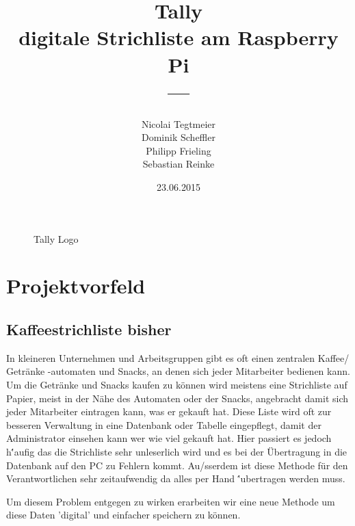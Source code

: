 \documentclass[11pt,a4paper]{article} %
\title{\normalfont\bfseries{Tally\\ digitale Strichliste am Raspberry Pi}\\---}
\author{Nicolai Tegtmeier \\ Dominik Scheffler \\ Philipp Frieling \\ Sebastian Reinke}
\date{23.06.2015}
\begin{document}



\begin{titlepage}
	\maketitle
	\begin{figure}[h]
	\caption{Tally Logo}
	\end{figure}
\end{titlepage}

\tableofcontents
\newpage

\section{Projektvorfeld}
\label{Grundlagen}


\subsection{Kaffeestrichliste bisher}

In kleineren Unternehmen und Arbeitsgruppen gibt es oft einen zentralen Kaffee/ Getr\"anke -automaten und Snacks, an denen sich jeder Mitarbeiter bedienen kann. Um die Getr\"anke und Snacks kaufen zu k\"onnen wird meistens eine Strichliste auf Papier, meist in der N\"ahe des Automaten oder der Snacks, angebracht damit sich jeder Mitarbeiter eintragen kann, was er gekauft hat. Diese Liste wird oft zur besseren Verwaltung in eine Datenbank oder Tabelle eingepflegt, damit der Administrator einsehen kann wer wie viel gekauft hat. Hier passiert es jedoch h\''aufig das die Strichliste sehr unleserlich wird und es bei der \"Ubertragung in die Datenbank auf den PC zu Fehlern kommt. Au/ss{}erdem ist diese Methode f\"ur den Verantwortlichen sehr zeitaufwendig da alles per Hand \''ubertragen werden muss.
\par
Um diesem Problem entgegen zu wirken erarbeiten wir eine neue Methode um diese Daten 'digital' und einfacher speichern zu k\"onnen.
\end{document}
